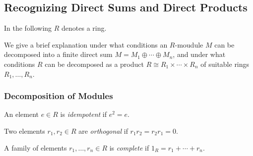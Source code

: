 \subsection{Recognizing Direct Sums and Direct Products}


\begin{conventions}
  In the following $R$ denotes a ring.
\end{conventions}


\begin{fluff}
  We give a brief explanation under what conditions an $R$-moudule $M$ can be decomposed into a finite direct sum $M = M_1 \oplus \dotsb \oplus M_n$, and under what conditions $R$ can be decomposed as a product $R \cong R_1 \times \dotsb \times R_n$ of suitable rings $R_1, \dotsc, R_n$.
\end{fluff}





\subsubsection{Decomposition of Modules}


\begin{definition}
  An element $e \in R$ is \emph{idempotent} if $e^2 = e$.
\end{definition}


\begin{definition}
  Two elements $r_1, r_2 \in R$ are \emph{orthogonal} if $r_1 r_2 = r_2 r_1 = 0$.
\end{definition}


\begin{definition}
  A family of elements $r_1, \dotsc, r_n \in R$ is \emph{complete} if $1_R = r_1 + \dotsb + r_n$.
\end{definition}


